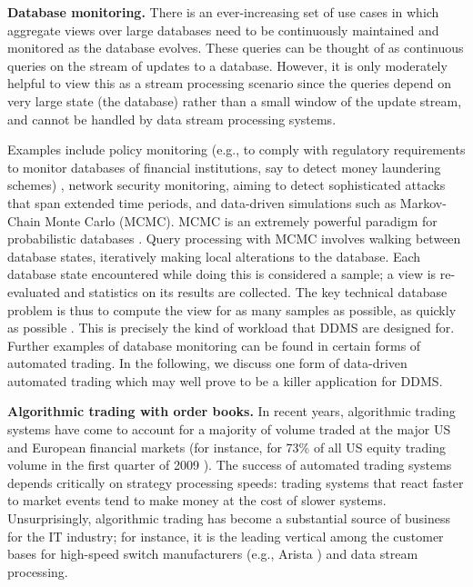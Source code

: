 \medskip


{\bf Database monitoring.}\/
There is an ever-increasing set of use cases in which aggregate views
over large databases need to be continuously maintained and monitored as
the database evolves. These queries can be thought of as continuous queries
on the stream of updates to a database. However, it is only moderately
helpful to view this as a stream processing scenario since the queries
depend on very large state (the database) rather than a small window of the
update stream, and cannot be handled by data stream processing systems.

Examples include policy monitoring (e.g., to comply with regulatory requirements to monitor databases of financial institutions,
say to detect money laundering schemes) \cite{BKM2010},
network security monitoring, aiming to detect sophisticated attacks
that span extended time periods, and data-driven simulations such as
Markov-Chain Monte Carlo (MCMC). MCMC is an extremely
powerful paradigm for probabilistic databases \cite{DKM2010}.
Query processing with MCMC involves walking between database 
states, iteratively making local alterations to the database.
Each database state encountered while doing this is considered a sample;
a view is re-evaluated and statistics on its results are collected.
The key technical database
problem is thus to compute the view for as many samples as
possible, as quickly as possible \cite{WMM2010}. This is precisely
the kind of workload that DDMS are designed for.
%
Further examples of database monitoring can be found in
certain forms of automated trading.
In the following, we discuss one form of data-driven automated trading which may well prove to
be a killer application for DDMS.


\medskip


{\bf Algorithmic trading with order books.}\/
In recent years, algorithmic trading systems have come to account for a majority
of volume traded at the major US and European financial markets (for instance,
for 73\% of all US equity trading volume in the first quarter of 2009
\cite{Iati2009}). The success of automated trading systems depends critically on
strategy processing speeds: trading systems that react faster to market events
tend to make money at the cost of slower systems. Unsurprisingly, algorithmic
trading has become a substantial source of business for the IT industry; for
instance, it is the leading vertical among the customer bases for high-speed
switch manufacturers (e.g., Arista \cite{Becht2010}) and data stream processing.




